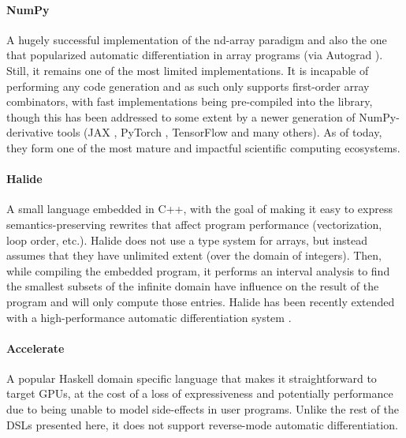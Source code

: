\documentclass[acmsmall,screen,nonacm]{acmart}
\begin{document}
\paragraph{NumPy \cite{harris2020numpy}}
\label{sec:numpy}
A hugely successful implementation of the nd-array paradigm and also the one that popularized automatic differentiation in array programs (via Autograd \cite{maclaurin2015autograd}).
Still, it remains one of the most limited implementations.
It is incapable of performing any code generation and as such only supports first-order array combinators, with fast implementations being pre-compiled into the library, though this has been addressed to some extent by a newer generation of NumPy-derivative tools (JAX \cite{jax2018github}, PyTorch \cite{paszke2019pytorch}, TensorFlow \cite{abadi2016tensorflow} and many others).
As of today, they form one of the most mature and impactful scientific computing ecosystems.

\paragraph{Halide \cite{ragankelley2013halide}}
\label{sec:halide}
A small language embedded in C++, with the goal of making it easy to express semantics-preserving rewrites that affect program performance (vectorization, loop order, etc.).
Halide does not use a type system for arrays, but instead assumes that they have unlimited extent (over the domain of integers).
Then, while compiling the embedded program, it performs an interval analysis to find the smallest subsets of the infinite domain have influence on the result of the program and will only compute those entries.
Halide has been recently extended with a high-performance automatic differentiation system \cite{li2018halidead}.

\paragraph{Accelerate \cite{mcdonell2013optimizing}}
\label{sec:accelerate}
A popular Haskell domain specific language that makes it straightforward to target GPUs, at the cost of a loss of expressiveness and potentially performance due to being unable to model side-effects in user programs.
Unlike the rest of the DSLs presented here, it does not support reverse-mode automatic differentiation.

\fi
\end{document}
